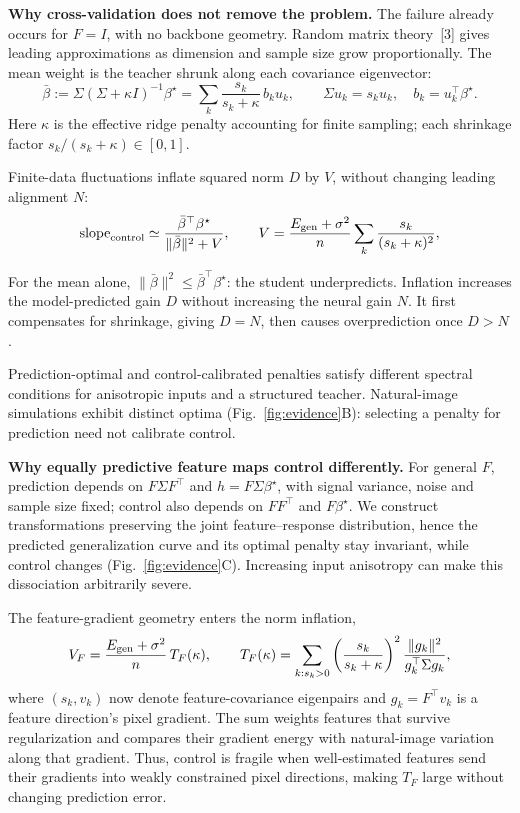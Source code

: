 \documentclass[12pt,a4paper]{article}
\newcommand{\head}[1]{\par\noindent\textbf{#1}\enspace\ignorespaces}
\newcommand{\bt}{\beta^\star}
\newcommand{\mb}{\bar\beta}
\begin{document}
\head{Why cross-validation does not remove the problem.}
The failure already occurs for $F=I$, with no backbone geometry. Random matrix theory~[3] gives leading approximations as dimension and sample size grow proportionally. The mean weight is the teacher shrunk along each covariance eigenvector:
\begin{equation}
\mb:=\Sigma(\Sigma+\kappa I)^{-1}\bt
=\sum_k\frac{s_k}{s_k+\kappa}\,b_k u_k,
\qquad \Sigma u_k=s_k u_k,\quad b_k=u_k^\top\bt.
\label{eq:mean-shrinkage}
\end{equation}
Here $\kappa$ is the effective ridge penalty accounting for finite sampling; each shrinkage factor $s_k/(s_k+\kappa)\in[0,1]$.\par
Finite-data fluctuations inflate squared norm $D$ by $V$, without changing leading alignment $N$:
\begin{equation}
\mathrm{slope}_{\rm control}\simeq
\frac{\mb^\top\bt}{\|\mb\|^2+V},
\qquad
V=\frac{E_{\rm gen}+\sigma^2}{n}
\sum_k\frac{s_k}{(s_k+\kappa)^2},
\label{eq:inflation}
\end{equation}\par
For the mean alone, $\|\mb\|^2\le\mb^\top\bt$: the student underpredicts. Inflation increases the model-predicted gain $D$ without increasing the neural gain $N$. It first compensates for shrinkage, giving $D=N$, then causes overprediction once $D>N$.\par
Prediction-optimal and control-calibrated penalties satisfy different spectral conditions for anisotropic inputs and a structured teacher. Natural-image simulations exhibit distinct optima (Fig.~\ref{fig:evidence}B): selecting a penalty for prediction need not calibrate control.\par

\head{Why equally predictive feature maps control differently.}
For general $F$, prediction depends on $F\Sigma F^\top$ and $h=F\Sigma\bt$, with signal variance, noise and sample size fixed; control also depends on $FF^\top$ and $F\bt$. We construct transformations preserving the joint feature--response distribution, hence the predicted generalization curve and its optimal penalty stay invariant, while control changes (Fig.~\ref{fig:evidence}C). Increasing input anisotropy can make this dissociation arbitrarily severe.

The feature-gradient geometry enters the norm inflation, 
\begin{equation}
V_F=\frac{E_{\rm gen}+\sigma^2}{n}\,T_F(\kappa),
\qquad
T_F(\kappa)=\sum_{k:s_k>0}
\left(\frac{s_k}{s_k+\kappa}\right)^2
\frac{\|g_k\|^2}{g_k^\top\Sigma g_k},
\label{eq:features}
\end{equation}
where $(s_k,v_k)$ now denote feature-covariance eigenpairs and $g_k=F^\top v_k$ is a feature direction's pixel gradient. The sum weights features that survive regularization and compares their gradient energy with natural-image variation along that gradient. Thus, control is fragile when well-estimated features send their gradients into weakly constrained pixel directions, making $T_F$ large without changing prediction error.
\end{document}
